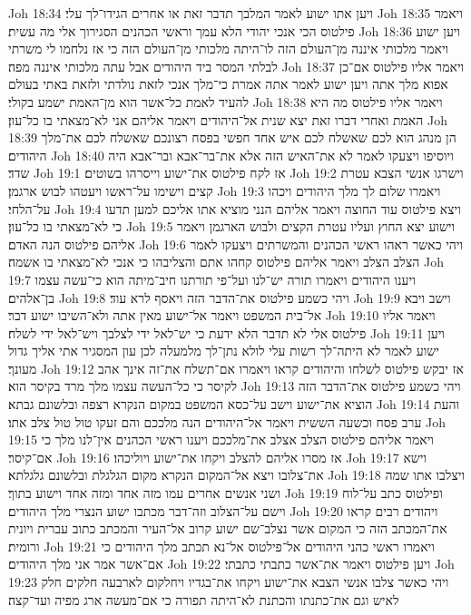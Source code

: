Joh 18:34  ויען אתו ישוע לאמר המלבך תדבר זאת או אחרים הגידו־לך עלי׃
Joh 18:35  ויאמר פילטוס הכי אנכי יהודי הלא עמך וראשי הכהנים הסגירוך אלי מה עשית׃
Joh 18:36  ויען ישוע ויאמר מלכותי איננה מן־העולם הזה לו־היתה מלכותי מן־העולם הזה כי אז נלחמו לי משרתי לבלתי המסר ביד היהודים אבל עתה מלכותי איננה מפה׃
Joh 18:37  ויאמר אליו פילטוס אם־כן אפוא מלך אתה ויען ישוע לאמר אתה אמרת כי־מלך אנכי לזאת נולדתי ולזאת באתי בעולם להעיד לאמת כל־אשר הוא מן־האמת ישמע בקולי׃
Joh 18:38  ויאמר אליו פילטוס מה היא האמת ואחרי דברו זאת יצא שנית אל־היהודים ויאמר אליהם אני לא־מצאתי בו כל־עון׃
Joh 18:39  הן מנהג הוא לכם שאשלח לכם איש אחד חפשי בפסח רצונכם שאשלח לכם את־מלך היהודים׃
Joh 18:40  ויוסיפו ויצעקו לאמר לא את־האיש הזה אלא את־בר־אבא ובר־אבא היה שדד׃
Joh 19:1  אז לקח פילטוס את־ישוע וייסרהו בשוטים׃
Joh 19:2  וישרגו אנשי הצבא עטרת קצים וישימו על־ראשו ויעטהו לבוש ארגמן׃
Joh 19:3  ויאמרו שלום לך מלך היהודים ויכהו על־הלחי׃
Joh 19:4  ויצא פילטוס עוד החוצה ויאמר אליהם הנני מוציא אתו אליכם למען תדעו כי לא־מצאתי בו כל־עון׃
Joh 19:5  וישוע יצא החוץ ועליו עטרת הקצים ולבוש הארגמן ויאמר אליהם פילטוס הנה האדם׃
Joh 19:6  ויהי כאשר ראהו ראשי הכהנים והמשרתים ויצעקו לאמר הצלב הצלב ויאמר אליהם פילטוס קחהו אתם והצליבהו כי אנכי לא־מצאתי בו אשמה׃
Joh 19:7  ויענו היהודים ויאמרו תורה יש־לנו ועל־פי תורתנו חיב־מיתה הוא כי־עשה עצמו בן־אלהים׃
Joh 19:8  ויהי כשמע פילטוס את־הדבר הזה ויאסף לרא עוד׃
Joh 19:9  וישב ויבא אל־בית המשפט ויאמר אל־ישוע מאין אתה ולא־השיבו ישוע דבר׃
Joh 19:10  ויאמר אליו פילטוס אלי לא תדבר הלא ידעת כי יש־לאל ידי לצלבך ויש־לאל ידי לשלח׃
Joh 19:11  ויען ישוע לאמר לא היתה־לך רשות עלי לולא נתן־לך מלמעלה לכן עון המסגיר אתי אליך גדול מעונך׃
Joh 19:12  אז יבקש פילטוס לשלחו והיהודים קראו ויאמרו אם־תשלח את־זה אינך אהב לקיסר כי כל־העשה עצמו מלך מרד בקיסר הוא׃
Joh 19:13  ויהי כשמע פילטוס את־הדבר הזה הוציא את־ישוע וישב על־כסא המשפט במקום הנקרא רצפה ובלשונם גבתא׃
Joh 19:14  והעת ערב פסח וכשעה הששית ויאמר אל־היהודים הנה מלככם והם זעקו טול טול צלב אתו׃
Joh 19:15  ויאמר אליהם פילטוס הצלב אצלב את־מלככם ויענו ראשי הכהנים אין־לנו מלך כי אם־קיסר׃
Joh 19:16  אז מסרו אליהם להצלב ויקחו את־ישוע ויוליכהו׃
Joh 19:17  וישא את־צלובו ויצא אל־המקום הנקרא מקום הגלגלת ובלשונם גלגלתא׃
Joh 19:18  ויצלבו אתו שמה ושני אנשים אחרים עמו מזה אחד ומזה אחד וישוע בתוך׃
Joh 19:19  ופילטוס כתב על־לוח וישם על־הצלוב וזה־דבר מכתבו ישוע הנצרי מלך היהודים׃
Joh 19:20  ויהודים רבים קראו את־המכתב הזה כי המקום אשר נצלב־שם ישוע קרוב אל־העיר והמכתב כתוב עברית ויונית ורומית׃
Joh 19:21  ויאמרו ראשי כהני היהודים אל־פילטוס אל־נא תכתב מלך היהודים כי אם־אשר אמר אני מלך היהודים׃
Joh 19:22  ויען פילטוס ויאמר את־אשר כתבתי כתבתי׃
Joh 19:23  ויהי כאשר צלבו אנשי הצבא את־ישוע ויקחו את־בגדיו ויחלקום לארבעה חלקים חלק לאיש וגם את־כתנתו והכתנת לא־היתה תפורה כי אם־מעשה ארג מפיה ועד־קצה׃
